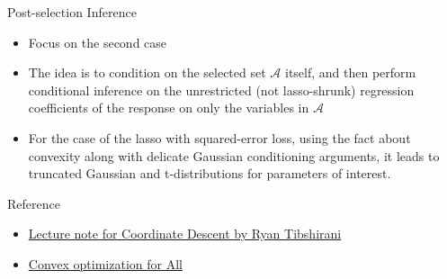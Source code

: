 \documentclass[11pt]{beamer}
\newcommand{\A}{\mathcal{A}}
\begin{document}
\begin{frame}{Post-selection Inference}
    \begin{itemize}
        \item Focus on the second case
        \item The idea is to condition on the selected set $\A$ itself, and then perform conditional inference on the unrestricted (not lasso-shrunk) regression coefficients of the response on only the variables in $\A$
        \item For the case of the lasso with squared-error loss, using the fact about convexity along with delicate Gaussian conditioning arguments, it leads to truncated Gaussian and t-distributions for parameters of interest.
    \end{itemize}
\end{frame}

\begin{frame}{Reference}
    \nocite{efron_hastie_2016}
    
    \begin{itemize}
        \item \href{http://www.stat.cmu.edu/~ryantibs/convexopt/lectures/coord-desc.pdf}{Lecture note for Coordinate Descent by Ryan Tibshirani}
        \item \href{https://wikidocs.net/23714}{Convex optimization for All}
    \end{itemize}
\end{frame}
\end{document}
